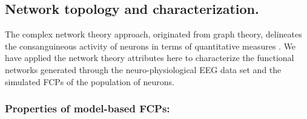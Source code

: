 \documentclass[preprintnumbers,amsmath,amssymb,onecolumn]{revtex4}
\begin{document}
\subsection{Network topology and characterization.}

{\noindent}The complex network theory approach, originated from graph theory, delineates the consanguineous activity of neurons in terms of quantitative measures \citep{Papo2014,Bullmore2009}. We have applied the network theory attributes here to characterize the functional networks generated through the neuro-physiological EEG data set and the simulated FCPs of the population of neurons.

\subsubsection{Properties of model-based FCPs:}
\end{document}
